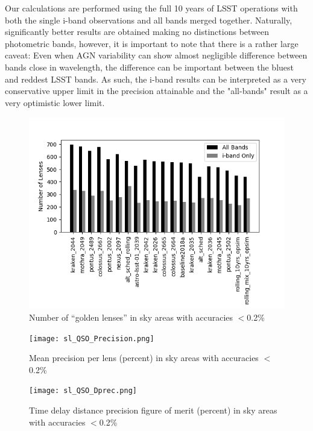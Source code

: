 Our calculations are performed using the full 10 years of LSST operations with both the single i-band observations and all bands merged together. Naturally, significantly better results are obtained making no distinctions between photometric bands, however, it is important to note that there is a rather large caveat: Even when AGN variability can show almost negligible difference between bands close in wavelength, the difference can be important between the bluest and reddest LSST bands. As such, the i-band results can be interpreted as a very conservative upper limit in the precision attainable and the "all-bands" result as a very optimistic lower limit.

\begin{figure}
\centering
\includegraphics[width=\linewidth]{figures/sl_QSO_Nlens.png}    
		\caption{Number of ``golden lenses'' in sky areas with accuracies $<$0.2\%}   
\end{figure}

\begin{figure}
\centering
\texttt{[image: sl\_QSO\_Precision.png]}    
		\caption{Mean precision per lens (percent) in  sky areas with accuracies $<$0.2\%}  
\end{figure}
\begin{figure}
\centering
		\texttt{[image: sl\_QSO\_Dprec.png]}    
		\caption{Time delay distance precision figure of merit (percent) in  sky areas with accuracies $<$0.2\%} 
\end{figure}

